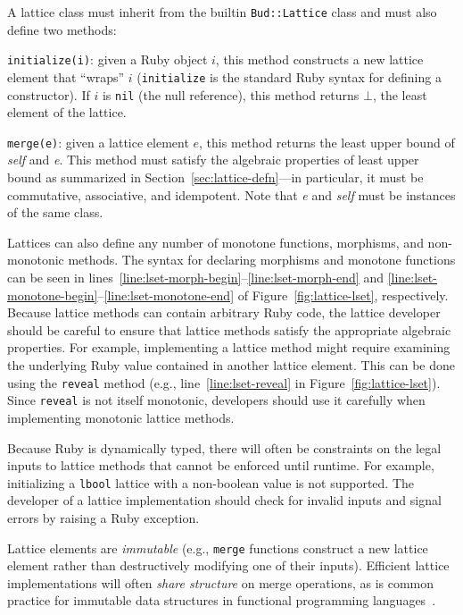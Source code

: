 A lattice class must inherit from the builtin \texttt{Bud::Lattice} class and
must also define two methods:
\begin{compactitem}
\item \texttt{initialize(i)}: given a Ruby object $i$, this method constructs a
  new lattice element that ``wraps'' $i$ (\texttt{initialize} is the standard
  Ruby syntax for defining a constructor). If $i$ is \texttt{nil} (the null
  reference), this method returns $\bot$, the least element of the lattice.

\item \texttt{merge(e)}: given a lattice element $e$, this method returns the
  least upper bound of \emph{self} and \emph{e}. This method must satisfy the
  algebraic properties of least upper bound as summarized in
  Section~\ref{sec:lattice-defn}---in particular, it must be commutative,
  associative, and idempotent. Note that \emph{e} and \emph{self} must be
  instances of the same class.
\end{compactitem}
Lattices can also define any number of monotone functions, morphisms, and
non-monotonic methods. The syntax for declaring morphisms and monotone functions
can be seen in lines~\ref{line:lset-morph-begin}--\ref{line:lset-morph-end} and
\ref{line:lset-monotone-begin}--\ref{line:lset-monotone-end} of
Figure~\ref{fig:lattice-lset}, respectively. Because lattice methods can contain
arbitrary Ruby code, the lattice developer should be careful to ensure that
lattice methods satisfy the appropriate algebraic properties. For example,
implementing a lattice method might require examining the underlying Ruby value
contained in another lattice element. This can be done using the \texttt{reveal}
method (e.g., line~\ref{line:lset-reveal} in Figure~\ref{fig:lattice-lset}).
Since \texttt{reveal} is not itself monotonic, developers should use it
carefully when implementing monotonic lattice methods.

Because Ruby is dynamically typed, there will often be constraints on the legal
inputs to lattice methods that cannot be enforced until runtime. For example,
initializing a \texttt{lbool} lattice with a non-boolean value is not
supported. The developer of a lattice implementation should check for invalid
inputs and signal errors by raising a Ruby exception.

Lattice elements are \emph{immutable} (e.g., \texttt{merge} functions construct
a new lattice element rather than destructively modifying one of their
inputs). Efficient lattice implementations will often \emph{share structure} on merge
operations, as is common practice for immutable data structures in functional
programming languages~\cite{Okasaki1999}. %

